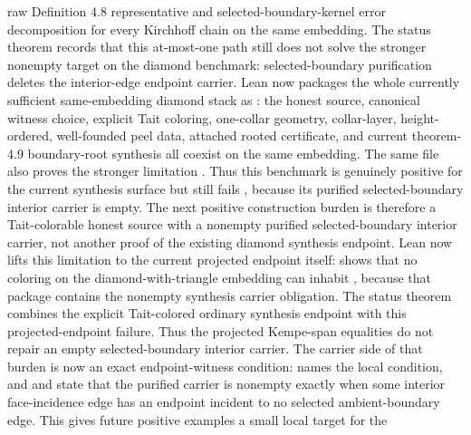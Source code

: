 \documentclass[11pt]{article}
\begin{document}
raw Definition 4.8 representative and selected-boundary-kernel error
decomposition for every Kirchhoff chain on the same embedding.
The status theorem
records that this at-most-one path still does not solve the stronger nonempty
target on the diamond benchmark: selected-boundary purification deletes the
interior-edge endpoint carrier.
Lean now packages the whole currently sufficient same-embedding diamond stack
as
:
the honest source, canonical witness choice, explicit Tait coloring,
one-collar geometry, collar-layer, height-ordered, well-founded peel data,
attached rooted certificate, and current theorem-4.9 boundary-root synthesis
all coexist on the same embedding.  The same file also proves the stronger
limitation
.
Thus this benchmark is genuinely positive for the current synthesis surface
but still fails
, because its purified
selected-boundary interior carrier is empty.  The next positive construction
burden is therefore a Tait-colorable honest source with a nonempty purified
selected-boundary interior carrier, not another proof of the existing diamond
synthesis endpoint.
Lean now lifts this limitation to the current projected endpoint itself:
shows that no coloring on the diamond-with-triangle embedding can inhabit
, because that package
contains the nonempty synthesis carrier obligation.  The status theorem
combines the explicit Tait-colored ordinary synthesis endpoint with this
projected-endpoint failure.  Thus the projected Kempe-span equalities do not
repair an empty selected-boundary interior carrier.
The carrier side of that burden is now an exact endpoint-witness condition:
 names the local condition, and
and
state that the purified carrier is nonempty exactly when some interior
face-incidence edge has an endpoint incident to no selected ambient-boundary
edge.  This gives future positive examples a small local target for the
\end{document}
